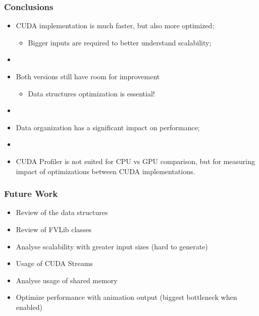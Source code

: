 \documentclass{beamer}
\begin{document}
\begin{frame}
	\frametitle{Conclusions}

	\begin{itemize}
		\item CUDA implementation is much faster, but also more optimized;
		\begin{itemize}
			\item[] Bigger inputs are required to better understand scalability;
		\end{itemize}
		\item[]
		\item Both versions still have room for improvement
		\begin{itemize}
			\item[] Data structures optimization is essential!
		\end{itemize}
		\item[]
		\item Data organization has a significant impact on performance;
		\item[]
		\item CUDA Profiler is not suited for CPU vs GPU comparison, but for measuring impact of optimizations between CUDA implementations.
	\end{itemize}
\end{frame}

\begin{frame}
	\frametitle{Future Work}

	\begin{itemize}
		\item Review of the data structures
		\item Review of FVLib classes
		\item Analyse scalability with greater input sizes (hard to generate)
		\item Usage of CUDA Streams
		\item Analyse usage of shared memory
		\item Optimize performance with animation output (biggest bottleneck when enabled)
	\end{itemize}
\end{frame}
\end{document}

